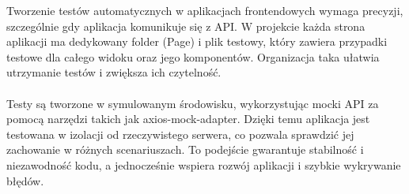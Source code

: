 \documentclass[12pt,a4paper]{article}
\begin{document}
\newpage

\noindent
Tworzenie testów automatycznych w aplikacjach frontendowych wymaga precyzji, szczególnie gdy aplikacja komunikuje się z API. W projekcie każda strona aplikacji ma dedykowany folder (Page) i plik testowy, który zawiera przypadki testowe dla całego widoku oraz jego komponentów. Organizacja taka ułatwia utrzymanie testów i zwiększa ich czytelność.
\\\\
Testy są tworzone w symulowanym środowisku, wykorzystując mocki API za pomocą narzędzi takich jak axios-mock-adapter. Dzięki temu aplikacja jest testowana w izolacji od rzeczywistego serwera, co pozwala sprawdzić jej zachowanie w różnych scenariuszach. To podejście gwarantuje stabilność i niezawodność kodu, a jednocześnie wspiera rozwój aplikacji i szybkie wykrywanie błędów.
\end{document}
